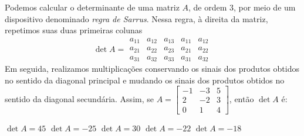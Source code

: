 Podemos calcular o determinante de uma matriz $A$, de ordem $3$, por meio de um dispositivo denominado {\it regra de Sarrus}. Nessa regra, à direita da matriz, repetimos suas duas primeiras colunas
\[\det A = \begin{array}{|ccc|cc}
a_{11} &  a_{12}  &  a_{13}  &  a_{11}  &  a_{12}\\
a_{21} &  a_{22}  &  a_{23}  &  a_{21}  &  a_{22}\\
a_{31} &  a_{32}  &  a_{33}  &  a_{31}  &  a_{32}
\end{array} \]
Em seguida, realizamos multiplicações conservando os sinais dos produtos obtidos no sentido da diagonal principal e mudando os sinais dos produtos obtidos no sentido da diagonal secundária. Assim,
se $A = \left[ \begin{array}{ccc}
 -1 &   -3  &   5\\
 2  &  -2   &  3\\
 0   &  1   &  4
\end{array} \right]$, então $\det A$ é:

$\det A = 45$
$\det A = -25$
$\det A = 30$
$\det A = -22$
$\det A = -18$



